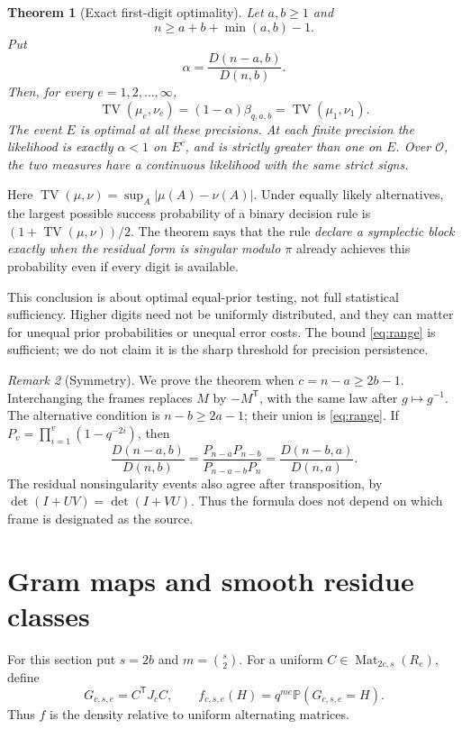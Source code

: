 \documentclass[11pt]{article}
\newtheorem{theorem}{Theorem}[section]
\theoremstyle{remark}
\newtheorem{remark}[theorem]{Remark}
\newcommand{\OO}{\mathcal O}
\newcommand{\PP}{\mathbb P}
\newcommand{\Mat}{\operatorname{Mat}}
\newcommand{\TV}{\operatorname{TV}}
\newcommand{\trans}{\mathsf T}
\begin{document}
\begin{theorem}[Exact first-digit optimality]\label{thm:main}
Let \(a,b\ge1\) and
\[
 n\ge a+b+\min(a,b)-1.
 \tag{2.3}\label{eq:range}
\]
Put
\[
 \alpha=\frac{D(n-a,b)}{D(n,b)}.
 \tag{2.4}\label{eq:alpha}
\]
Then, for every \(e=1,2,\ldots,\infty\),
\[
 \boxed{\quad
 \TV(\mu_e,\nu_e)=(1-\alpha)\beta_{q,a,b}
                =\TV(\mu_1,\nu_1).\quad}
 \tag{2.5}\label{eq:tv}
\]
The event \(E\) is optimal at all these precisions. At each finite precision
the likelihood is exactly \(\alpha<1\) on \(E^c\), and is strictly greater
than one on \(E\). Over \(\OO\), the two measures have a continuous
likelihood with the same strict signs.
\end{theorem}

Here \(\TV(\mu,\nu)=\sup_A|\mu(A)-\nu(A)|\).
Under equally likely alternatives, the largest possible success probability
of a binary decision rule is \((1+\TV(\mu,\nu))/2\). The theorem says
that the rule \emph{declare a symplectic block exactly when the residual
form is singular modulo \(\pi\)} already achieves this probability even
if every digit is available.

This conclusion is about optimal equal-prior testing, not full statistical
sufficiency. Higher digits need not be uniformly distributed, and they can
matter for unequal prior probabilities or unequal error costs.
The bound \eqref{eq:range} is sufficient; we do not claim it is the sharp
threshold for precision persistence.

\begin{remark}[Symmetry]
We prove the theorem when \(c=n-a\ge2b-1\).
Interchanging the frames replaces \(M\) by \(-M^\trans\), with the same law
after \(g\mapsto g^{-1}\). The alternative condition is \(n-b\ge2a-1\);
their union is \eqref{eq:range}.
If \(P_v=\prod_{i=1}^v(1-q^{-2i})\), then
\[
 \frac{D(n-a,b)}{D(n,b)}
  =\frac{P_{n-a}P_{n-b}}{P_{n-a-b}P_n}
  =\frac{D(n-b,a)}{D(n,a)}.
\]
The residual nonsingularity events also agree after transposition, by
\(\det(I+UV)=\det(I+VU)\). Thus the formula does not depend on which frame
is designated as the source.
\end{remark}

\section{Gram maps and smooth residue classes}

For this section put \(s=2b\) and \(m=\binom{s}{2}\).
For a uniform \(C\in\Mat_{2c,s}(R_e)\), define
\[
 G_{c,s,e}=C^\trans J_cC,\qquad
 f_{c,s,e}(H)=q^{me}\PP(G_{c,s,e}=H).
 \tag{3.1}\label{eq:gramdensity}
\]
Thus \(f\) is the density relative to uniform alternating matrices.
\end{document}

